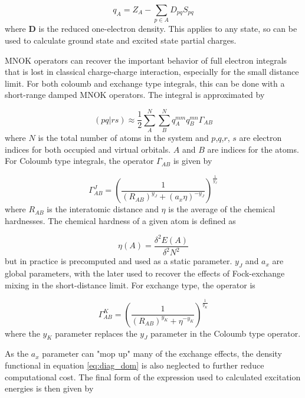 \begin{equation}
q_A = Z_A - \sum_{p \in A} D_{pq} S_{pq}  
\end{equation}
%
where $\mathbf{D}$ is the reduced one-electron density. This applies to any state,
so can be used to calculate ground state and excited state partial charges.

MNOK operators can recover the important behavior of full electron integrals that
is lost in classical charge-charge interaction, especially for the small distance limit.
For both coloumb and exchange type integrals, this can be done with a short-range
damped MNOK operators. The integral is approximated by

\begin{equation}
\left(pq|rs\right) \approx \frac{1}{2}\sum^N_A \sum^N_B q_A^{mm} q_B^{mn} \Gamma_{AB}
\end{equation}
%
where $N$ is the total number of atoms in the system and $p$,$q$,$r$, $s$ are electron
indices for both occupied and virtual orbitals. $A$ and $B$ are indices for the atoms.
For Coloumb type integrals, the operator $\Gamma_{AB}$ is given by

\begin{equation}
\Gamma^J_{AB} = \left(\frac{1}{\left(R_{AB}\right)^{y_J} + \left(a_x \eta\right)^{-y_J}} \right)^{\frac{1}{y_J}}
\end{equation}
%
where $R_{AB}$ is the interatomic distance and $\eta$ is the average of the chemical 
hardnesses. The chemical hardness of a given atom is defined as

\begin{equation}
\eta\left(A\right) = \frac{\delta^2 E\left(A\right)}{\delta^2 N^2}
\end{equation}
%
but in practice is precomputed and used as a static parameter. $y_J$ and $a_x$ are
global parameters, with the later used to recover the effects of Fock-exchange mixing
in the short-distance limit. For exchange type, the operator is

\begin{equation}
\Gamma^K_{AB} = \left(\frac{1}{\left(R_{AB}\right)^{y_K} + \eta^{-y_K}} \right)^{\frac{1}{y_K}}
\end{equation}
%
where the $y_K$ parameter replaces the $y_J$ parameter in the Coloumb type operator.

As the $a_x$ parameter can "mop up" many of the exchange effects, the density functional
in equation \ref{eq:diag_dom} is also neglected to further reduce computational cost.
The final form of the expression used to calculated excitation energies is then 
given by

